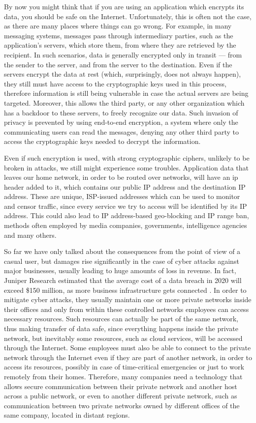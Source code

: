 \documentclass[a4paper,12pt]{report}
\begin{document}
		By now you might think that if you are using an application which encrypts its data, you should be safe on the Internet. Unfortunately, this is often not the case, as there are many places where things can go wrong. For example, in many messaging systems, messages pass through intermediary parties, such as the application's servers, which store them, from where they are retrieved by the recipient. In such scenarios, data is generally encrypted only in transit --- from the sender to the server, and from the server to the destination. Even if the servers encrypt the data at rest (which, surprisingly, does not always happen), they still must have access to the cryptographic keys used in this process, therefore information is still being vulnerable in case the actual servers are being targeted. Moreover, this allows the third party, or any other organization which has a backdoor to these servers, to freely recognize our data. Such invasion of privacy is prevented by using end-to-end encryption, a system where only the communicating users can read the messages, denying any other third party to access the cryptographic keys needed to decrypt the information.
		
		Even if such encryption is used, with strong cryptographic ciphers, unlikely to be broken in attacks, we still might experience some troubles. Application data that leaves our home network, in order to be routed over networks, will have an \acrfull{ip} header added to it, which contains our public IP address and the destination IP address. These are unique, ISP-issued addresses which can be used to monitor and censor traffic, since every service we try to access will be identified by its IP address. This could also lead to IP address-based geo-blocking and IP range ban, methods often employed by media companies, governments, intelligence agencies and many others.
		
		So far we have only talked about the consequences from the point of view of a casual user, but damages rise significantly in the case of cyber attacks against major businesses, usually leading to huge amounts of loss in revenue. In fact, Juniper Research estimated that the average cost of a data breach in 2020 will exceed \$150 million, as more business infrastructure gets connected \cite{juniper}. In order to mitigate cyber attacks, they usually maintain one or more private networks inside their offices and only from within these controlled networks employees can access necessary resources. Such resources can actually be part of the same network, thus making transfer of data safe, since everything happens inside the private network, but inevitably some resources, such as cloud services, will be accessed through the Internet. Some employees must also be able to connect to the private network through the Internet even if they are part of another network, in order to access its resources, possibly in case of time-critical emergencies or just to work remotely from their homes. Therefore, many companies need a technology that allows secure communication between their private network and another host across a public network, or even to another different private network, such as communication between two private networks owned by different offices of the same company, located in distant regions.
		
\end{document}
